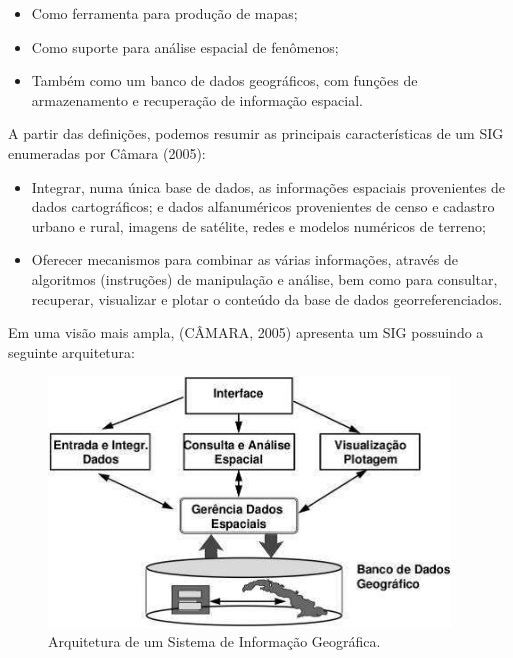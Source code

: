 \documentclass[
	12pt,				%
    oneside,			%
	a4paper,			%
	english,			%
	french,				%
	spanish,			%
	brazil,				%
	]{abntex2}
\begin{document}
\begin{itemize}
    \item Como ferramenta para produção de mapas;
    \item Como suporte para análise espacial de fenômenos;
    \item Também como um banco de dados geográficos, com funções de armazenamento e recuperação de informação espacial.
\end{itemize}

A partir das definições, podemos resumir as principais características de um SIG enumeradas por Câmara (2005):

\begin{itemize}
	\item Integrar, numa única base de dados, as informações espaciais provenientes de dados cartográficos; e dados alfanuméricos provenientes de censo e cadastro urbano e rural, imagens de satélite, redes e modelos numéricos de terreno;
	
	\item Oferecer mecanismos para combinar as várias informações, através de algoritmos (instruções) de manipulação e análise, bem como para consultar, recuperar, visualizar e plotar o conteúdo da base de dados georreferenciados.
\end{itemize}


Em uma visão mais ampla, (CÂMARA, 2005) apresenta um SIG possuindo a seguinte arquitetura: 

\begin{figure} [H] 
\label{figura1} 
\caption{Arquitetura de um Sistema de Informação Geográfica.}
\includegraphics[width=0.95\textwidth]{arquitetura.png} %
\end{figure}
\end{document}
